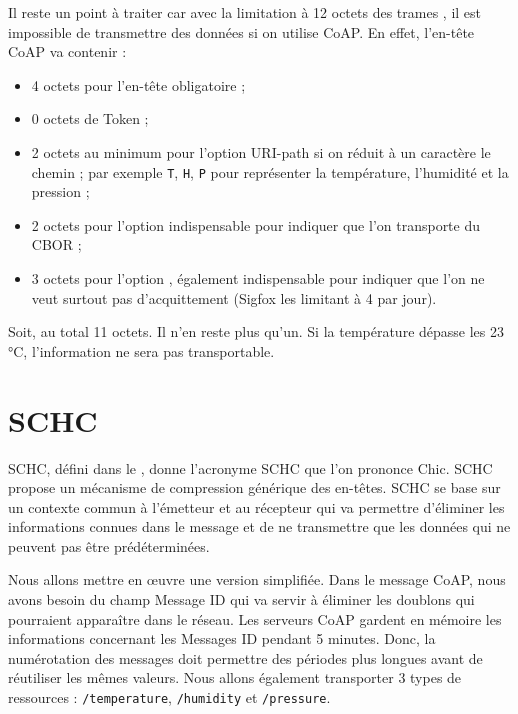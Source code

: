          \vspace{1em}

Il reste un point à traiter car avec la limitation à 12 octets des trames , il est impossible de transmettre des données si on utilise CoAP. En effet, l'en-tête CoAP va contenir :
\begin{itemize}
\item 4 octets pour l'en-tête obligatoire ;
\item 0 octets de Token ;
\item 2 octets au minimum pour l'option URI-path si on réduit à un caractère le chemin ; par exemple \texttt{T}, \texttt{H}, \texttt{P} pour représenter la température, l'humidité et la pression ;
\item 2 octets pour l'option  indispensable pour indiquer que l'on transporte du CBOR ;
\item 3 octets pour l'option , également indispensable pour indiquer que l'on ne veut surtout pas d'acquittement (Sigfox les limitant à 4 par jour).
\end{itemize}
Soit, au total 11 octets. Il n'en reste plus qu'un. Si la température dépasse les 23 °C, l'information ne sera pas transportable.

\section{SCHC}

\acl{SCHC}, défini dans le , donne l'acronyme SCHC que l'on prononce Chic. SCHC propose un mécanisme de compression générique des en-têtes. SCHC se base sur un contexte commun à l'émetteur et au récepteur qui va permettre d'éliminer les informations connues dans le message et de ne transmettre que les données qui ne peuvent pas être prédéterminées.

         \vspace{1em}

Nous allons mettre en œuvre une version simplifiée. Dans le message CoAP, nous avons besoin du champ Message ID qui va servir à éliminer les doublons qui pourraient apparaître dans le réseau. Les serveurs CoAP gardent en mémoire les informations concernant les Messages ID pendant 5 minutes. Donc, la numérotation des messages doit permettre des périodes plus longues avant de réutiliser les mêmes valeurs. Nous allons également transporter 3 types de ressources : \texttt{/temperature}, \texttt{/humidity} et \texttt{/pressure}.

